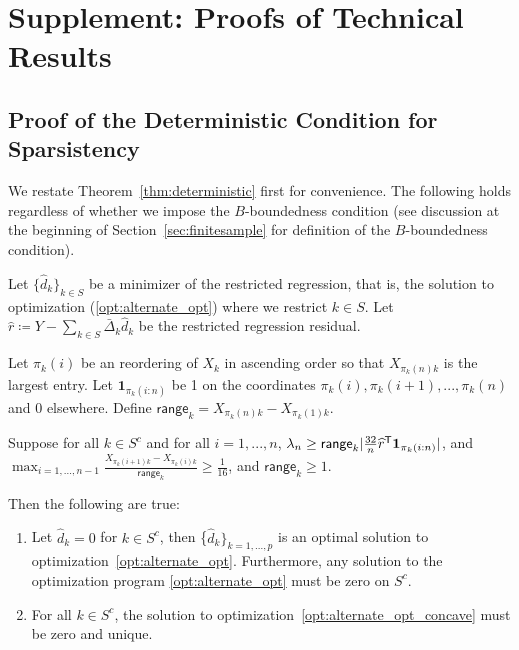 
\section{Supplement:  Proofs of Technical Results}
 
 
 \subsection{Proof of the Deterministic Condition for Sparsistency}
 \label{sec:deterministic_proof}
 
We restate Theorem~\ref{thm:deterministic} first for convenience. 
The following holds regardless of whether we impose the $B$-boundedness condition (see discussion at the beginning of Section~\ref{sec:finitesample} for definition of the $B$-boundedness condition).
 
\begin{theorem} 
Let $\{\hat{d}_k \}_{k \in S}$ be a minimizer of the restricted regression, that is, the solution to optimization (\ref{opt:alternate_opt}) where we restrict $k \in S$. 
Let $\hat{r} \coloneqq Y - \sum_{k \in S} \bar{\Delta}_k \hat{d}_k$ be the restricted regression residual. 


Let $\pi_k(i)$ be an reordering of $X_k$ in ascending order so that $X_{\pi_k(n)k}$ is the largest entry. Let $\mathbf{1}_{\pi_k(i:n)}$ be 1 on the coordinates $\pi_k(i),\pi_k(i+1),...,\pi_k(n)$ and 0 elsewhere. Define $\mathsf{range}_k = X_{\pi_k(n)k} - X_{\pi_k(1)k}$.

Suppose for all $k\in S^c$ and for all $i=1,...,n$, $\lambda_n \geq \mathsf{range}_k | \frac{32}{n} \widehat{r}^{\mathsf{T}} \mbox{\boldmath $1$}_{\pi_k(i:n)}|$, and $\max_{i=1,...,n-1} \frac{X_{\pi_k(i+1)k} - X_{\pi_k(i)k}}{\mathsf{range}_k} \geq \frac{1}{16}$, and $\mathsf{range}_k \geq 1$.

Then the following are true:
\begin{enumerate}
\item Let $\hat{d}_k = 0$ for $k \in S^c$, then \{$\hat{d}_k\}_{k=1,...,p}$ is an optimal solution to optimization~\ref{opt:alternate_opt}. Furthermore, any solution to the optimization program \ref{opt:alternate_opt} must be zero on $S^c$.
\item For all $k \in S^c$, the solution to optimization~\ref{opt:alternate_opt_concave} must be zero and unique.
\end{enumerate}
\end{theorem}



